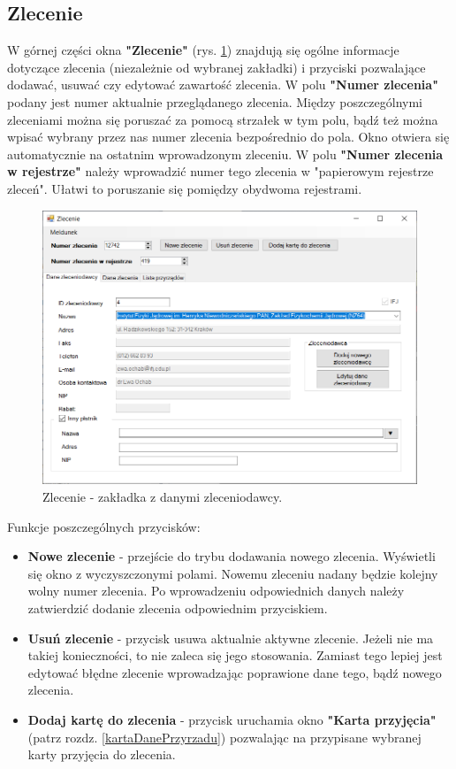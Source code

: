 \subsection{Zlecenie}
\label{zlecenie}

W górnej części okna \textbf{"Zlecenie"} (rys. \ref{zlecenieDaneZleceniodawcy}) znajdują się ogólne informacje dotyczące zlecenia (niezależnie od wybranej zakładki) i przyciski pozwalające dodawać, usuwać czy edytować zawartość zlecenia. 
W polu \textbf{"Numer zlecenia"} podany jest numer aktualnie przeglądanego zlecenia. Między poszczególnymi zleceniami można się poruszać za pomocą strzałek w tym polu, bądź też można wpisać wybrany przez nas numer zlecenia bezpośrednio do pola. Okno otwiera się automatycznie na ostatnim wprowadzonym zleceniu.
W polu \textbf{"Numer zlecenia w rejestrze"} należy wprowadzić numer tego zlecenia w "papierowym rejestrze zleceń". Ułatwi to poruszanie się pomiędzy obydwoma rejestrami.
 
 \begin{figure}[htb]
 	\centering
 	\includegraphics[width=\columnwidth]{obrazki/Biuro/zlecenie/zlecenie_dane_zleceniodawcy.png}
 	\caption{Zlecenie - zakładka z danymi zleceniodawcy.}
 	\label{zlecenieDaneZleceniodawcy}
 \end{figure}
 
Funkcje poszczególnych przycisków:
\begin{itemize}
	\item \textbf{Nowe zlecenie} - przejście do trybu dodawania nowego zlecenia. Wyświetli się okno z wyczyszczonymi polami. Nowemu zleceniu nadany będzie kolejny wolny numer zlecenia. Po wprowadzeniu odpowiednich danych należy zatwierdzić dodanie zlecenia odpowiednim przyciskiem.
	\item \textbf{Usuń zlecenie} - przycisk usuwa aktualnie aktywne zlecenie. Jeżeli nie ma takiej konieczności, to nie zaleca się jego stosowania. Zamiast tego lepiej jest edytować błędne zlecenie wprowadzając poprawione dane tego, bądź nowego zlecenia.
	\item \textbf{Dodaj kartę do zlecenia} - przycisk uruchamia okno \textbf{"Karta przyjęcia"} (patrz rozdz. \ref{kartaDanePrzyrzadu}) pozwalając na przypisane wybranej karty przyjęcia do zlecenia.
\end{itemize}

